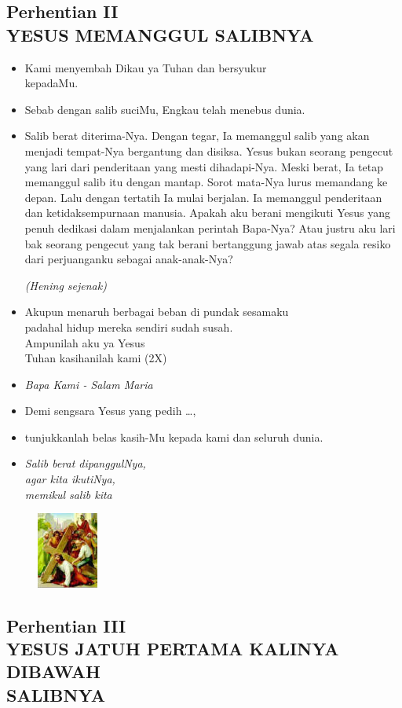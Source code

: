 \documentclass[a5paper,headsepline,titlepage,11pt,nnormalheadings,DIVcalc]{scrbook}
\newcommand{\BU}[1]{\begin{itemize} \item[U:] #1 \end{itemize}}
\newcommand{\BP}[1]{\begin{itemize} \item[P:] #1 \end{itemize}}
\newcommand{\kamiMenyembah}{\BP{ Kami menyembah Dikau ya Tuhan dan bersyukur\\kepadaMu.}
\BU{ Sebab dengan salib suciMu, Engkau telah menebus dunia.}
}
\newcommand{\kasihanilahKami}{\BP{Demi sengsara Yesus yang pedih \ldots,}
\BU{tunjukkanlah belas kasih-Mu kepada kami dan seluruh dunia.}}
\def\hening{\par \textit{(Hening sejenak)}}
\begin{document}
\subsection*{Perhentian II\\
YESUS MEMANGGUL SALIBNYA}


\kamiMenyembah
\BP{Salib berat diterima-Nya. Dengan tegar, Ia memanggul salib yang akan menjadi tempat-Nya bergantung dan disiksa. Yesus bukan seorang pengecut yang lari dari penderitaan yang mesti dihadapi-Nya. Meski berat, Ia tetap memanggul salib itu dengan mantap. Sorot mata-Nya lurus memandang ke depan. Lalu dengan tertatih Ia mulai berjalan. Ia memanggul penderitaan dan ketidaksempurnaan manusia. Apakah aku berani mengikuti Yesus yang penuh dedikasi dalam menjalankan perintah Bapa-Nya? Atau justru aku lari bak seorang pengecut yang tak berani bertanggung jawab atas segala resiko dari perjuanganku sebagai anak-anak-Nya?

\hening
}

\BU{Akupun menaruh berbagai beban di pundak sesamaku\\ padahal hidup mereka sendiri sudah susah.\\ Ampunilah aku ya Yesus\\ 
Tuhan kasihanilah kami (2X)}



\large\begin{itemize}\item[~]\it{Bapa Kami - Salam Maria}\end{itemize}\normalsize
\kasihanilahKami

\begin{itemize}
\item[3.] \it{Salib berat dipanggulNya,\\ 
	agar kita ikutiNya,\\ 
	memikul salib kita}
\end{itemize}

\begin{figure}
\includegraphics[width=2cm]{jalansalib_files/03_small.jpg}
\end{figure}
\subsection*{Perhentian III\\
YESUS JATUH PERTAMA KALINYA DIBAWAH\\SALIBNYA}
\end{document}
